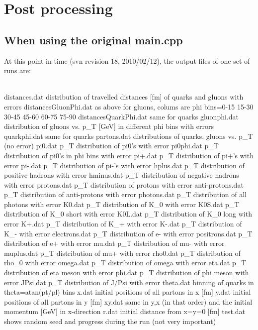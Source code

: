 \chapter{Post processing}
\label{post}
\section{When using the original main.cpp}
At this point in time (svn revision 18, 2010/02/12), the output files of one set of runs are:\\
~\\
{\small
\begin{boxedverbatim}
distances.dat           distribution of travelled distances [fm] of quarks and gluons with errors   
distancesGluonPhi.dat   as above for gluons, colums are phi bins=0-15 15-30 30-45 45-60 60-75 75-90
distancesQuarkPhi.dat   same for quarks
gluonphi.dat            distribution of gluons vs. p_T [GeV] in different phi bins with errors
quarkphi.dat            same for quarks
partons.dat             distributions of quarks, gluons vs. p_T (no error)
pi0.dat                 p_T distribution of pi0's with error
pi0phi.dat              p_T distribution of pi0's in phi bins with error  
pi+.dat                 p_T distribution of pi+'s with error
pi-.dat                 p_T distribution of pi-'s with error
hplus.dat               p_T distribution of positive hadrons with error 
hminus.dat              p_T distribution of negative hadrons with error
protons.dat             p_T distribution of protons with error
anti-protons.dat        p_T distribution of anti-protons with error
photons.dat             p_T distribution of all photons with error
K0.dat                  p_T distribution of K_0 with error
K0S.dat                 p_T distribution of K_0 short with error 
K0L.dat                 p_T distribution of K_0 long with error
K+.dat                  p_T distribution of K_+ with error
K-.dat                  p_T distribution of K_- with error 
electrons.dat           p_T distribution of e- with error
positrons.dat           p_T distribution of e+ with error
mu.dat                  p_T distribution of mu- with error
muplus.dat              p_T distribution of mu+ with error
rho0.dat                p_T distribution of rho_0 with error
omega.dat               p_T distribution of omega with error
eta.dat                 p_T distribution of eta meson with error
phi.dat                 p_T distribution of phi meson with error
JPsi.dat                p_T distribution of J/Psi with error
theta.dat               binning of quarks in theta=atan(pt/pl) bins 
x.dat                   initial positions of all partons in x [fm]
y.dat                   initial positions of all partons in y [fm]
xy.dat                  same in y,x (in that order) and the initial momentum [GeV] in x-direction
r.dat                   initial distance from x=y=0 [fm]
test.dat                shows random seed and progress during the run (not very important)
\end{boxedverbatim}
}
~\\

